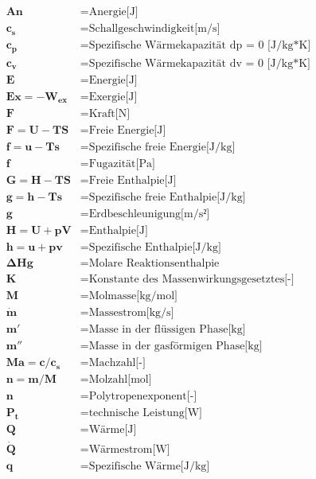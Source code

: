 \documentclass[twocolumn]{article}
\begin{document}
\begin{align*}
	\mathbf{An}		&=	\text{Anergie[J]} \\
	\mathbf{c_s}		&=	\text{Schallgeschwindigkeit[m/s]} \\
	\mathbf{c_p}		&=	\text{Spezifische Wärmekapazität dp = 0 [J/kg*K]} \\
	\mathbf{c_v}		&=	\text{Spezifische Wärmekapazität dv = 0 [J/kg*K]} \\
	\mathbf{E}		&=	\text{Energie[J]} \\
	\mathbf{Ex = -W_{ex}}	&=	\text{Exergie[J]} \\
	\mathbf{F}		&=	\text{Kraft[N]} \\
	\mathbf{F = U - TS}	&=	\text{Freie Energie[J]} \\
	\mathbf{f = u-Ts}	&=	\text{Spezifische freie Energie[J/kg]} \\
	\mathbf{f}		&=	\text{Fugazität[Pa]} \\
	\mathbf{G = H -TS}	&=	\text{Freie Enthalpie[J]} \\
	\mathbf{g = h -Ts}	&=	\text{Spezifische freie Enthalpie[J/kg]} \\
	\mathbf{g}		&=	\text{Erdbeschleunigung[m/s²]} \\
	\mathbf{H = U+pV}	&=	\text{Enthalpie[J]} \\
	\mathbf{h = u + pv}	&=	\text{Spezifische Enthalpie[J/kg]} \\
	\mathbf{\Delta Hg}	&=	\text{Molare Reaktionsenthalpie} \\
	\mathbf{K}		&=	\text{Konstante des Massenwirkungsgesetztes[-]} \\
	\mathbf{M}		&=	\text{Molmasse[kg/mol]} \\
	\mathbf{\dot{m}}	&=	\text{Massestrom[kg/s]} \\
	\mathbf{m'}		&=	\text{Masse in der flüssigen Phase[kg]} \\
	\mathbf{m''}		&=	\text{Masse in der gasförmigen Phase[kg]} \\
	\mathbf{Ma=c/c_s}	&=	\text{Machzahl[-]} \\
	\mathbf{n=m/M}		&=	\text{Molzahl[mol]} \\
	\mathbf{n}		&=	\text{Polytropenexponent[-]} \\
	\mathbf{P_t}		&=	\text{technische Leistung[W]} \\
	\mathbf{Q}		&=	\text{Wärme[J]} \\
	\mathbf{\dot{Q}}	&=	\text{Wärmestrom[W]} \\
	\mathbf{q}		&=	\text{Spezifische Wärme[J/kg]} \\

\end{align*}
\end{document}
